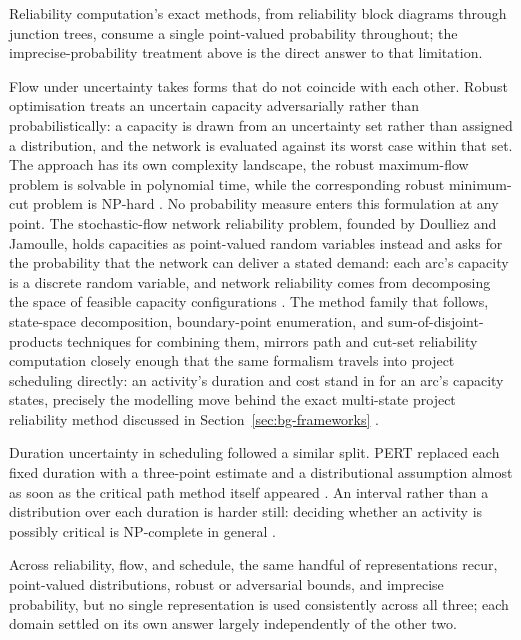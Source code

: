 \documentclass[12pt]{report}
\begin{document}
Reliability computation's exact methods, from reliability block diagrams through junction trees,
consume a single point-valued probability throughout; the imprecise-probability treatment above
is the direct answer to that limitation.

Flow under uncertainty takes forms that do not coincide with each other. Robust optimisation
treats an uncertain capacity adversarially rather than probabilistically: a capacity is drawn
from an uncertainty set rather than assigned a distribution, and the network is evaluated
against its worst case within that set. The approach has its own complexity landscape, the
robust maximum-flow problem is solvable in polynomial time, while the corresponding robust
minimum-cut problem is NP-hard \cite{bertsimas2013robust}. No probability measure enters this
formulation at any point. The stochastic-flow network reliability problem, founded by Doulliez
and Jamoulle, holds capacities as point-valued random variables instead and asks for the
probability that the network can deliver a stated demand: each arc's capacity is a discrete
random variable, and network reliability comes from decomposing the space of feasible capacity
configurations \cite{doulliez1972transportation}. The method family that follows, state-space
decomposition, boundary-point enumeration, and sum-of-disjoint-products techniques for combining
them, mirrors path and cut-set reliability computation closely enough that the same formalism
travels into project scheduling directly: an activity's duration and cost stand in for an arc's
capacity states, precisely the modelling move behind the exact multi-state project reliability
method discussed in Section~\ref{sec:bg-frameworks} \cite{huang2020exact}.

Duration uncertainty in scheduling followed a similar split. PERT replaced each fixed duration
with a three-point estimate and a distributional assumption almost as soon as the critical path
method itself appeared \cite{malcolm1959pert}. An interval rather than a distribution over each
duration is harder still: deciding whether an activity is possibly critical is NP-complete in
general \cite{chanas2002complexity}.

Across reliability, flow, and schedule, the same handful of representations recur, point-valued
distributions, robust or adversarial bounds, and imprecise probability, but no single
representation is used consistently across all three; each domain settled on its own answer
largely independently of the other two.
\end{document}
